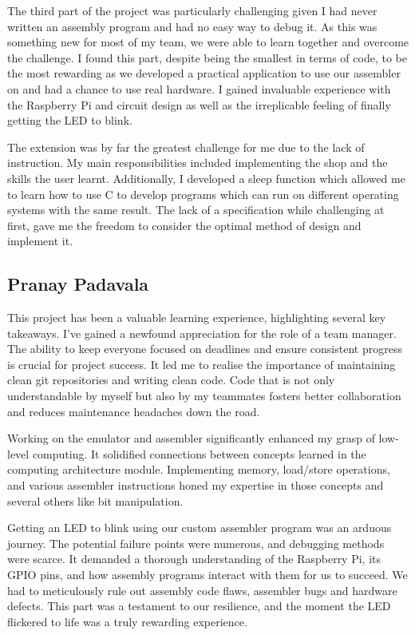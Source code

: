 \documentclass[9pt,a4paper,twoside]{tau-class/tau}
\begin{document}
    The third part of the project was particularly challenging given I had never written an assembly program and had no easy way to debug it. As this was something new for most of my team, we were able to learn together and overcome the challenge. I found this part, despite being the smallest in terms of code, to be the most rewarding as we developed a practical application to use our assembler on and had a chance to use real hardware. I gained invaluable experience with the Raspberry Pi and circuit design as well as the irreplicable feeling of finally getting the LED to blink. 
    
    The extension was by far the greatest challenge for me due to the lack of instruction. My main responsibilities included implementing the shop and the skills the user learnt. Additionally, I developed a sleep function which allowed me to learn how to use C to develop programs which can run on different operating systems with the same result. The lack of a specification while challenging at first, gave me the freedom to consider the optimal method of design and implement it.  
    
    \subsection{Pranay Padavala}
    
    This project has been a valuable learning experience, highlighting several key takeaways. I've gained a newfound appreciation for the role of a team manager. The ability to keep everyone focused on deadlines and ensure consistent progress is crucial for project success. It led me to realise the importance of maintaining clean git repositories and writing clean code. Code that is not only understandable by myself but also by my teammates fosters better collaboration and reduces maintenance headaches down the road. 
    
    Working on the emulator and assembler significantly enhanced my grasp of low-level computing. It solidified connections between concepts learned in the computing architecture module. Implementing memory, load/store operations, and various assembler instructions honed my expertise in those concepts and several others like bit manipulation. 
    
    Getting an LED to blink using our custom assembler program was an arduous journey. The potential failure points were numerous, and debugging methods were scarce. It demanded a thorough understanding of the Raspberry Pi, its GPIO pins, and how assembly programs interact with them for us to succeed. We had to meticulously rule out assembly code flaws, assembler bugs and hardware defects. This part was a testament to our resilience, and the moment the LED flickered to life was a truly rewarding experience. 
    
\end{document}
